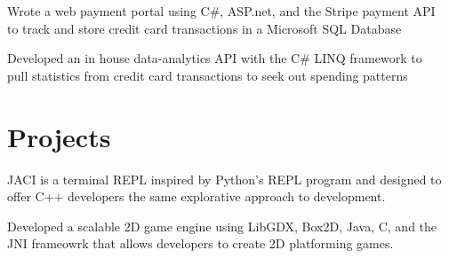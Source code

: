 \documentclass[]{deedy-resume-openfont}
\begin{document}
\begin{minipage}[t]{0.66\textwidth}
\begin{tightemize}
\item Wrote a web payment portal using C\#, ASP.net, and the Stripe payment API \\to track and store credit card transactions in a Microsoft SQL Database
\item Developed an in house data-analytics API with the C\# LINQ framework to \\pull statistics from credit card transactions to seek out spending patterns
\end{tightemize}
\sectionsep

\section{Projects}

\begin{tightemize}
\item JACI is a terminal REPL inspired by Python's REPL program and designed to offer C++ developers the same explorative approach to development.  
\end{tightemize}
\sectionsep

\begin{tightemize}
\item Developed a scalable 2D game engine using LibGDX, Box2D, Java, C, and the JNI frameowrk that allows developers to create 2D platforming games.
\end{tightemize}
\sectionsep

\end{minipage} 
\end{document}
